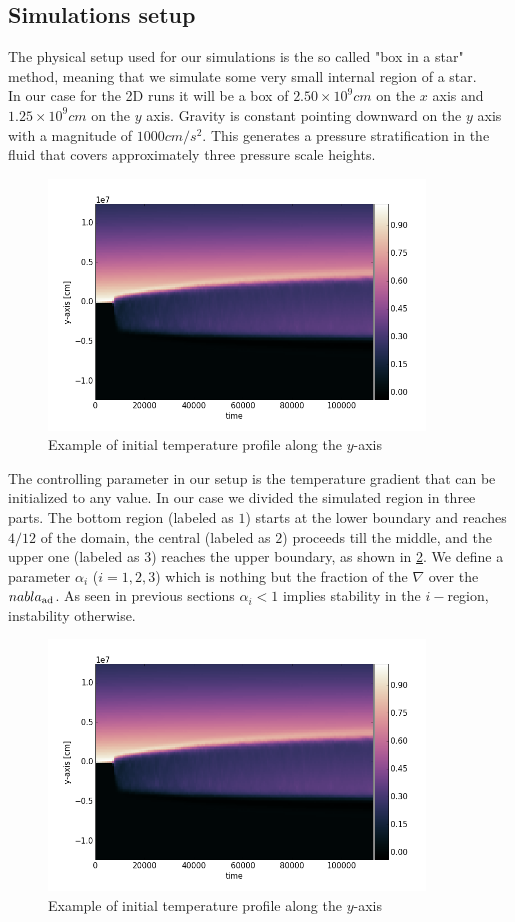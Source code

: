 \subsection{Simulations setup}
The physical setup used for our simulations is the so called "box in a star" method, meaning that we simulate some very small internal region of a star. \\
In our case for the 2D runs it will be a box of $2.50 \times 10^{9} cm$ on the $x$ axis and $1.25 \times 10^{9} cm$ on the $y$ axis. Gravity is constant pointing downward on the $y$ axis with a magnitude of $1000 cm/s^2$. This generates a pressure stratification in the fluid that covers approximately three pressure scale heights. \\
\begin{figure}[t]
\includegraphics[width=10cm]{./img/tempprofile}
\caption{Example of initial temperature profile along the $y$-axis}
\label{fig:tempprofile}
\centering
\end{figure}
The controlling parameter in our setup is the temperature gradient that can be initialized to any value. In our case we divided the simulated region in three parts. The bottom region (labeled as $1$) starts at the lower boundary and reaches $4/12$ of the domain, the central (labeled as $2$) proceeds till the middle, and the upper one (labeled as $3$) reaches the upper boundary, as shown in \ref{fig:tempprofile}. We define a parameter $\alpha_{i}$ ($i=1, 2, 3$) which is nothing but the fraction of the $\nabla$ over the $\/nabla_{\mathrm{ad}}$. As seen in previous sections $\alpha_{i}<1$ implies stability in the $i-$region, instability otherwise. \\
\begin{figure}[t]
\includegraphics[width=10cm]{./img/tempprofile}
\caption{Example of initial temperature profile along the $y$-axis}
\label{fig:tempprofile}
\centering
\end{figure}
